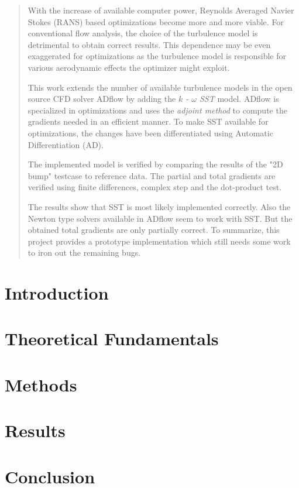 \documentclass[a4paper, 10pt]{report}
\begin{document}
    


    \begin{abstract}

        With the increase of available computer power, Reynolds Averaged Navier
        Stokes (RANS) based optimizations become more and more viable. For
        conventional flow analysis, the choice of the turbulence model is
        detrimental to obtain correct results. This dependence may be even
        exaggerated for optimizations as the turbulence model is responsible
        for various aerodynamic effects the optimizer might exploit.

        This work extends the number of available turbulence models in the open
        source CFD solver ADflow by adding the \textit{$k$ - $\omega$ SST}
        model. ADflow is specialized in optimizations and uses the
        \textit{adjoint method} to compute the gradients needed in an efficient
        manner. To make SST available for optimizations, the changes have been
        differentiated using Automatic Differentiation (AD). 

        The implemented model is verified by comparing the results of the "2D
        bump" testcase to reference data. The partial and total gradients are
        verified using finite differences, complex step and the dot-product
        test. 

        The results show that SST is most likely implemented correctly. Also
        the Newton type solvers available in ADflow seem to work with SST. But
        the obtained total gradients are only partially correct. To summarize,
        this project provides a prototype implementation which still needs some
        work to iron out the remaining bugs.
    \end{abstract}

    \tableofcontents\clearpage


    \chapter{Introduction}
    

    \chapter{Theoretical Fundamentals}
    

    \chapter{Methods}
    


    \chapter{Results}
    


    \chapter{Conclusion}
    

    \listoffigures\clearpage
    \listoftables\clearpage


    \printbibliography
\end{document}
